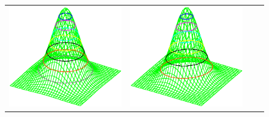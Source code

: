 \begin{figure}
\begin{tabular}{*{4}{c}}
  \includegraphics[width=4\tw/16, height=4\tw/16, clip=true]{../common/normxy_00.eps} &
  \includegraphics[width=4\tw/16, height=4\tw/16, clip=true]{../common/normxy_50.eps} &

\end{tabular}
\end{figure}
